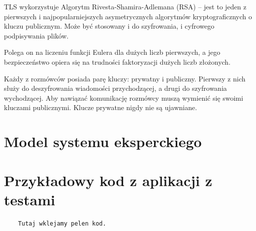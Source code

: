 \documentclass[12pt,a4paper]{article}
\begin{document}
	TLS wykorzystuje Algorytm Rivesta-Shamira-Adlemana (RSA) -- jest to jeden z pierwszych i najpopularniejszych asymetrycznych algorytmów kryptograficznych o kluczu publicznym. Może być stosowany i do szyfrowania, i cyfrowego podpisywania plików.
	
	\smallskip
	Polega on na liczeniu funkcji Eulera dla dużych liczb pierwszych, a jego bezpieczeństwo opiera się na trudności faktoryzacji dużych liczb złożonych.
	
	\smallskip
	Każdy z rozmówców posiada parę kluczy: prywatny i publiczny. Pierwszy z nich służy do deszyfrowania wiadomości przychodzącej, a drugi do szyfrowania wychodzącej. Aby nawiązać komunikację rozmówcy muszą wymienić się swoimi kluczami publicznymi. Klucze prywatne nigdy nie są ujawniane.
	
	
\section*{Model systemu eksperckiego}

\section*{Przykładowy kod z aplikacji z testami}

\begin{lstlisting}
	Tutaj wklejamy pelen kod. 
\end{lstlisting}
\end{document}
